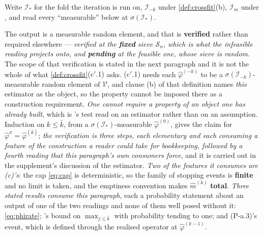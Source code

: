 \begin{definition}
Write $\mathcal I_\ast$ for the fold the iteration is run on, $\mathcal I_{-k}$ under
\cref{def:crossfit}\textup{(b)}, $\mathcal I_m$ under , and read every ``measurable''
below at $\sigma(\mathcal I_\ast)$.

The output is a measurable random element, and that is \textbf{verified} rather than required
elsewhere --- \emph{verified at the \textbf{fixed} sieve $\mathcal S_n$, which is what the infeasible
reading projects onto, and \textbf{pending} at the feasible one, whose sieve is random}. The scope of
that verification is stated in the next paragraph and it is not the whole of what
\cref{def:crossfit}\textup{(c$'$.1)} asks. \textup{(c$'$.1)} needs each $\hat\varphi^{(-k)}$ to be a
$\sigma(\mathcal I_{-k})$-measurable random element of $\mathcal V$, and clause \textup{(b)} of that
definition names \emph{this} estimator as the object, so the property cannot be imposed there as a
construction requirement. \emph{One cannot require a property of an object one has already built}, which is
's test read on an estimator rather than on an assumption. Induction on
$k\le\bar k$, from a $\sigma(\mathcal I_\ast)$-measurable $\hat\varphi^{(0)}$, gives the claim for
$\hat\varphi^{\pi}=\hat\varphi^{(\bar k)}$; \emph{the verification is three steps, each elementary and each
consuming a feature of the construction a reader could take for bookkeeping, followed by a fourth reading
that this paragraph's own consumers force}, and it is carried out in the supplement's discussion of the
estimator. \emph{Two of the features it consumes are \textup{(c)}'s}: the cap \eqref{eq:cap} is
deterministic, so the family of stopping events is \textbf{finite} and no limit is taken, and the emptiness
convention makes $\hat m^{(k)}$ \textbf{total}. \emph{Three stated results consume this paragraph}, each a
probability statement about an output of one of the two readings and none of them well posed without it:
\eqref{eq:phirate};
's bound on $\max_{j\le\bar k}$ with probability tending to one; and (P-a.3)'s
event, which is defined through the realised operator at $\hat\varphi^{(k-1)}$.


\end{definition}
